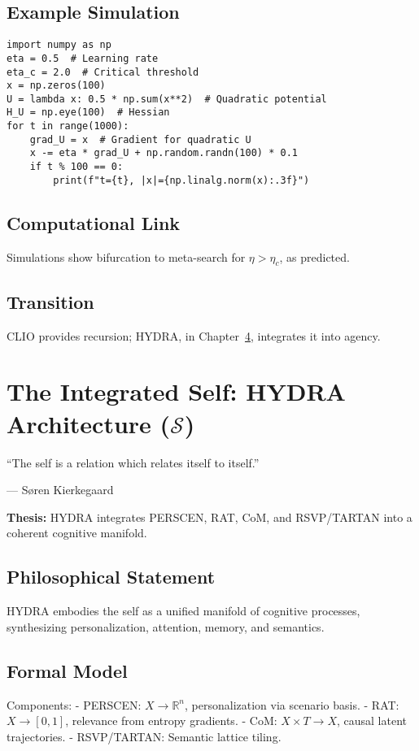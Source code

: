 \documentclass[12pt]{book}
\theoremstyle{definition}
\begin{document}
\section{Example Simulation}
\begin{lstlisting}[caption={CLIO Oscillation Simulation}, label={lst:clio_code}]
import numpy as np
eta = 0.5  # Learning rate
eta_c = 2.0  # Critical threshold
x = np.zeros(100)
U = lambda x: 0.5 * np.sum(x**2)  # Quadratic potential
H_U = np.eye(100)  # Hessian
for t in range(1000):
    grad_U = x  # Gradient for quadratic U
    x -= eta * grad_U + np.random.randn(100) * 0.1
    if t % 100 == 0:
        print(f"t={t}, |x|={np.linalg.norm(x):.3f}")
\end{lstlisting}

\section{Computational Link}
Simulations show bifurcation to meta-search for $\eta > \eta_c$, as predicted.

\section{Transition}
CLIO provides recursion; HYDRA, in Chapter~\ref{chap:hydra}, integrates it into agency.

\chapter{The Integrated Self: HYDRA Architecture ($\mathcal{S}$)}
\label{chap:hydra}
\epigraph{``The self is a relation which relates itself to itself.''}{--- Søren Kierkegaard}

\textbf{Thesis:} HYDRA integrates PERSCEN, RAT, CoM, and RSVP/TARTAN into a coherent cognitive manifold.

\section{Philosophical Statement}
HYDRA embodies the self as a unified manifold of cognitive processes, synthesizing personalization, attention, memory, and semantics.

\section{Formal Model}
Components:
- \textsf{PERSCEN}: $X \to \mathbb{R}^n$, personalization via scenario basis.
- \textsf{RAT}: $X \to [0,1]$, relevance from entropy gradients.
- \textsf{CoM}: $X \times T \to X$, causal latent trajectories.
- \textsf{RSVP/TARTAN}: Semantic lattice tiling.
\end{document}
